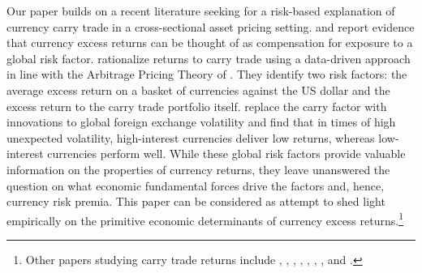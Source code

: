 Our paper builds on a recent literature seeking for a risk-based explanation of currency carry trade in a cross-sectional asset pricing setting. \citet{lustig_etal2011} and \citet{menkhoff_etal2012} report evidence that currency excess returns can be thought of as compensation for exposure to a global risk factor. \citet{lustig_etal2011} rationalize returns to carry trade using a data-driven approach in line with the Arbitrage Pricing Theory of \citet{Ross:76}. They identify two risk factors: the average excess return on a basket of currencies against the US dollar and the excess return to the carry trade portfolio itself. \citet{menkhoff_etal2012} replace the carry factor with innovations to global foreign exchange volatility and find that in times of high unexpected volatility, high-interest currencies deliver low returns, whereas low-interest currencies perform well. While these global risk factors provide valuable information on the properties of currency returns, they leave unanswered the question on what economic fundamental forces drive the factors and, hence, currency risk premia. This paper can be considered as attempt to shed light empirically on the primitive economic determinants of currency excess returns.\footnote{Other papers studying carry trade returns include \citet{brunnermeier_etal2009}, \citet{cc:2013}, \citet{farhi_etal2015}, \citet{hassan_mano2015}, \citet{jurek2014},  \citet{lettau_etal2014}, \citet{mueller_etal2015}, and \citet{mancini_etal2013}.}

